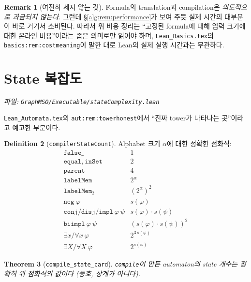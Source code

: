 \documentclass[11pt]{article}
\theoremstyle{definition}
\newtheorem{definition}{Definition}[section]
\newtheorem{remark}[definition]{Remark}
\theoremstyle{plain}
\newtheorem{theorem}[definition]{Theorem}
\newcommand{\lean}[1]{\texttt{#1}}
\newcommand{\leanfile}[1]{\texttt{#1}}
\begin{document}
\begin{remark}[여전히 세지 않는 것]
Formula의 translation과 compilation은 \emph{의도적으로 과금되지 않는다}.
그런데 \S\ref{alg:rem:performance}가 보여 주듯 실제 시간의 대부분이 바로
거기서 소비된다. 따라서 위 비용 정리는 ``고정된 formula에 대해 입력 크기에
대한 온라인 비용''이라는 좁은 의미로만 읽어야 하며,
\leanfile{Lean\_Basics.tex}의 \lean{basics:rem:costmeaning}이 말한 대로 Lean의
실제 실행 시간과는 무관하다.
\end{remark}

\section{State 복잡도}
\label{alg:sec:statecomplexity}

\emph{파일: \leanfile{GraphMSO/Executable/stateComplexity.lean}}

\leanfile{Lean\_Automata.tex}의 \lean{aut:rem:towerhonest}에서 ``진짜 tower가
나타나는 곳''이라고 예고한 부분이다.

\begin{definition}[\lean{compilerStateCount}]
\label{alg:def:statecount}
Alphabet 크기 $\alpha$에 대한 정확한 점화식:
\[
\begin{array}{ll}
  \lean{false\_} & 1 \\
  \lean{equal},\ \lean{inSet} & 2 \\
  \lean{parent} & 4 \\
  \lean{labelMem} & 2^{\alpha} \\
  \lean{labelMem₂} & (2^{\alpha})^2 \\
  \lean{neg}\ \varphi & s(\varphi) \\
  \lean{conj}/\lean{disj}/\lean{impl}\ \varphi\ \psi & s(\varphi)\cdot s(\psi) \\
  \lean{biimpl}\ \varphi\ \psi & (s(\varphi)\cdot s(\psi))^2 \\
  \exists x / \forall x\ \varphi & 2^{3\,s(\varphi)} \\
  \exists X / \forall X\ \varphi & 2^{s(\varphi)}
\end{array}
\]
\end{definition}

\begin{theorem}[\lean{compile\_state\_card}]
\label{alg:thm:statecard}
\lean{compile}이 만든 automaton의 state 개수는 정확히 위 점화식의 값이다
(등호, 상계가 아니다).
\end{theorem}
\end{document}
